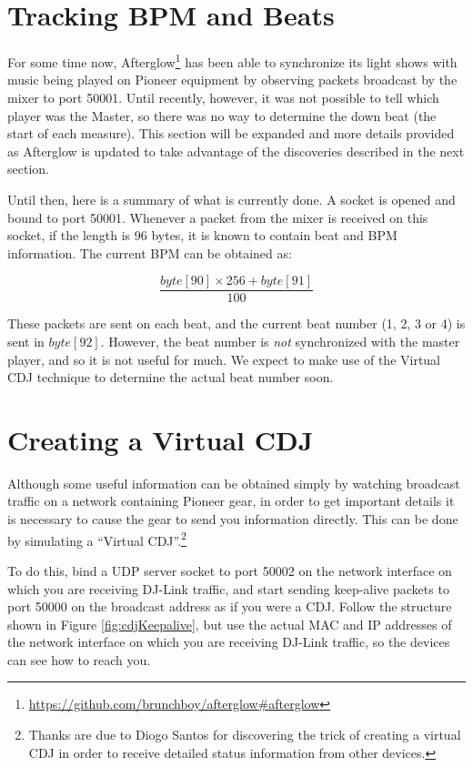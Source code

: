 \documentclass[11pt]{article}
\begin{document}
\section{Tracking BPM and Beats}

For some time now,
Afterglow\footnote{\url{https://github.com/brunchboy/afterglow\#afterglow}}
has been able to synchronize its light shows with music being played
on Pioneer equipment by observing packets broadcast by the mixer to
port 50001. Until recently, however, it was not possible to tell which
player was the Master, so there was no way to determine the down beat
(the start of each measure). This section will be expanded and more
details provided as Afterglow is updated to take advantage of the
discoveries described in the next section.

Until then, here is a summary of what is currently done. A socket is
opened and bound to port 50001. Whenever a packet from the mixer is
received on this socket, if the length is 96 bytes, it is known to
contain beat and BPM information. The current BPM can be obtained as:

\[ \frac{byte[90] \times 256 + byte[91]}{100} \]

These packets are sent on each beat, and the current beat number (1,
2, 3 or 4) is sent in $byte[92]$. However, the beat number is
\emph{not} synchronized with the master player, and so it is not
useful for much. We expect to make use of the Virtual CDJ technique to
determine the actual beat number soon.

\section{Creating a Virtual CDJ}

Although some useful information can be obtained simply by watching
broadcast traffic on a network containing Pioneer gear, in order to
get important details it is necessary to cause the gear to send you
information directly. This can be done by simulating a ``Virtual
CDJ''.\footnote{Thanks are due to Diogo Santos for discovering the
  trick of creating a virtual CDJ in order to receive detailed status
  information from other devices.}

To do this, bind a UDP server socket to port 50002 on the network
interface on which you are receiving DJ-Link traffic, and start
sending keep-alive packets to port 50000 on the broadcast address as
if you were a CDJ. Follow the structure shown in Figure
\ref{fig:cdjKeepalive}, but use the actual MAC and IP addresses of the
network interface on which you are receiving DJ-Link traffic, so the
devices can see how to reach you.
\end{document}
